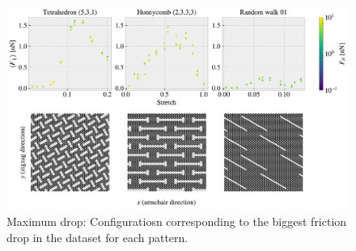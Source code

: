 \begin{figure}[H]
  \centering
  \includegraphics[width=\linewidth]{figures/stretch_profiles/PP_max_drop.pdf}
  \caption{Maximum drop: Configuratiosn corresponding to the biggest friction drop in the dataset for each pattern.}
  \label{fig:PP_max_drop}
\end{figure}  





